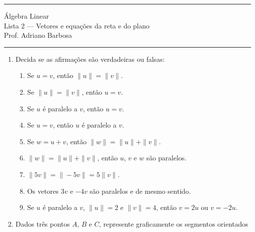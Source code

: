 \documentclass{article}
\begin{document}
\noindent{}\rule{\textwidth}{0.4pt}
\begin{center}
	\'{A}lgebra Linear\\
	Lista 2 --- Vetores e equa\c{c}\~oes da reta e do plano \\
	\vspace{0.2cm}
	Prof. Adriano Barbosa
\end{center}
\noindent{}\rule{\textwidth}{0.4pt}

\begin{enumerate}
\item Decida se as afirma\c{c}\~oes s\~ao verdadeiras ou falsas:

\begin{enumerate}
	\item Se $u = v$, ent\~ao $\|u\| = \|v\|$.
	\item Se $\|u\| = \|v\|$, ent\~ao $u = v$.
	\item Se $u$ \'e paralelo a $v$, ent\~ao $u = v$.
	\item Se $u = v$, ent\~ao $u$ \'e paralelo a $v$.
	\item Se $w = u + v$, ent\~ao $\|w\| = \|u\| + \|v\|$.
	\item $\|w\| = \|u\| + \|v\|$, ent\~ao $u$, $v$ e $w$ s\~ao paralelos.
	\item $\|5v\| = \|-5v\| = 5\|v\|$.
	\item Os vetores $3v$ e $-4v$ s\~ao paralelos e de mesmo sentido.
	\item Se $u$ \'e paralelo a $v$, $\|u\| = 2$ e $\|v\| = 4$, ent\~ao $v = 2u$ ou $v = -2u$.
\end{enumerate}

\item Dados tr\^es pontos $A$, $B$ e $C$, represente graficamente os segmentos orientados


\end{enumerate}
\end{document}
